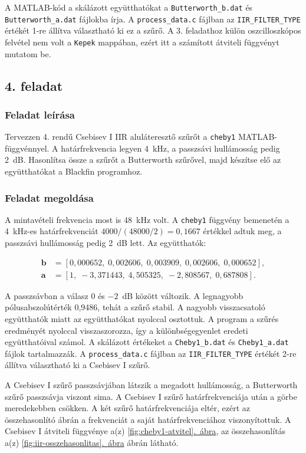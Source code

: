 \documentclass[12pt,a4paper]{article}
\newcommand{\abrara}[1]{\hyperref[#1]{\ref*{#1}.~ábra}}
\newcommand{\feladat}[1]{%
\phantomsection
\subsection*{#1. feladat}%
\addcontentsline{toc}{subsection}{#1. feladat}%
}
\begin{document}
A MATLAB-kód a skálázott együtthatókat a \texttt{Butterworth\_b.dat} és \texttt{Butterworth\_a.dat} fájlokba írja. A \texttt{process\_data.c} fájlban az \texttt{IIR\_FILTER\_TYPE} értékét 1-re állítva választható ki ez a szűrő. A 3. feladathoz külön oszcilloszkópos felvétel nem volt a \texttt{Kepek} mappában, ezért itt a számított átviteli függvényt mutatom be.

\newpage
\feladat{4}

\subsubsection*{Feladat leírása}

Tervezzen 4. rendű Csebisev I IIR aluláteresztő szűrőt a \texttt{cheby1} MATLAB-függvénnyel. A határfrekvencia legyen 4~kHz, a passzsávi hullámosság pedig 2~dB. Hasonlítsa össze a szűrőt a Butterworth szűrővel, majd készítse elő az együtthatókat a Blackfin programhoz.

\subsubsection*{Feladat megoldása}

A mintavételi frekvencia most is 48~kHz volt. A \texttt{cheby1} függvény bemenetén a 4~kHz-es határfrekvenciát $4000/(48000/2)=0{,}1667$ értékkel adtuk meg, a passzsávi hullámosság pedig 2~dB lett. Az együtthatók:

\begin{equation}
    \begin{aligned}
        \boldsymbol{b} &= [0{,}000652,\;0{,}002606,\;0{,}003909,\;0{,}002606,\;0{,}000652],\\
        \boldsymbol{a} &= [1,\;-3{,}371443,\;4{,}505325,\;-2{,}808567,\;0{,}687808].
    \end{aligned}
\end{equation}

A passzsávban a válasz 0 és $-2$~dB között változik. A legnagyobb pólusabszolútérték 0{,}9486, tehát a szűrő stabil. A nagyobb visszacsatoló együtthatók miatt az együtthatókat nyolccal osztottuk. A program a szűrés eredményét nyolccal visszaszorozza, így a különbségegyenlet eredeti együtthatóival számol. A skálázott értékeket a \texttt{Cheby1\_b.dat} és \texttt{Cheby1\_a.dat} fájlok tartalmazzák. A \texttt{process\_data.c} fájlban az \texttt{IIR\_FILTER\_TYPE} értékét 2-re állítva választható ki a Csebisev I szűrő.

A Csebisev I szűrő passzsávjában látszik a megadott hullámosság, a Butterworth szűrő passzsávja viszont sima. A Csebisev I szűrő határfrekvenciája után a görbe meredekebben csökken. A két szűrő határfrekvenciája eltér, ezért az összehasonlító ábrán a frekvenciát a saját határfrekvenciához viszonyítottuk. A Csebisev I átviteli függvénye a(z) \abrara{fig:cheby1-atvitel}, az összehasonlítás a(z) \abrara{fig:iir-osszehasonlitas} ábrán látható.
\end{document}
